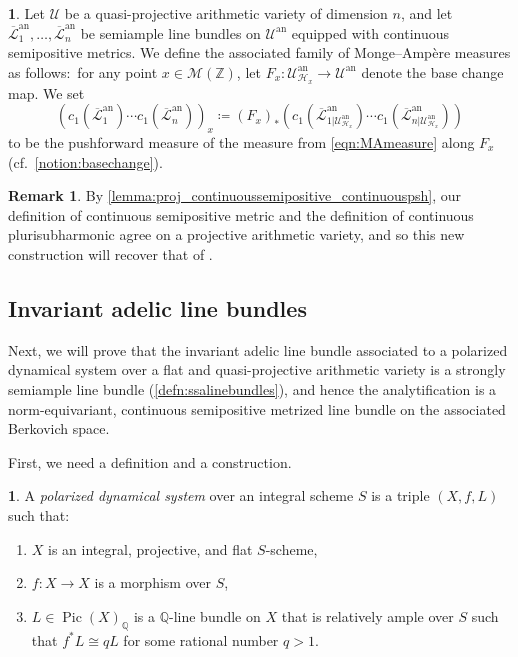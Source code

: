 \documentclass[11pt,reqno]{amsart}
\newcommand{\mZ}{\mathbb{Z}}
\newcommand{\mQ}{\mathbb{Q}}
\newcommand{\cU}{\mathcal{U}}
\newcommand{\cL}{\mathcal{L}}
\newcommand{\sH}{{\mathscr H}}
\newcommand{\sM}{{\mathscr M}}
\theoremstyle{theorem}
\numberwithin{equation}{subsection}
\numberwithin{equation}{subsection}
\theoremstyle{definition}
\newtheorem{definition}[subsubsection]{\text{Definition}}
\newtheorem{remark}[subsubsection]{Remark}
\theoremstyle{remark}
\numberwithin{equation}{subsubsection} \numberwithin{figure}{section}
\DeclareMathOperator{\an}{an}
\DeclareMathOperator{\Pic}{Pic}
\newcommand{\cdef}[1]{\textsf{\textit{#1}}}
\begin{document}
\begin{definition}\label{defn:MAmeasure_quasiproj}
Let $\cU$ be a quasi-projective arithmetic variety of dimension $n$, and let $\overline{\cL}_1^{\an},\dots, \overline{\cL}_n^{\an}$ be semiample line bundles on $\cU^{\an}$ equipped with continuous semipositive metrics.  
We define the associated family of Monge--Amp\`ere measures as follows:~for any point $x\in \sM(\mZ)$, let $F_x\colon \cU_{\sH_x}^{\an} \to \cU^{\an}$ denote the base change map. 
We set
\[
(c_1(\overline{\cL}_1^{\an})\cdots c_1(\overline{\cL}_n^{\an}))_x \coloneqq (F_x)_*(c_1(\overline{\cL}^{\an}_{1|\cU_{\sH_x}^{\an}})\cdots c_1(\overline{\cL}^{\an}_{n|\cU_{\sH_x}^{\an}}))
\]
to be the pushforward measure of the measure from \eqref{eqn:MAmeasure} along $F_x$ (cf.~\autoref{notion:basechange}). 
\end{definition}

\begin{remark}
By \autoref{lemma:proj_continuoussemipositive_continuouspsh}, our definition of continuous semipositive metric and the definition of continuous plurisubharmonic agree on a projective arithmetic variety, and so this new construction will recover that of \cite[Definition 4.8]{PilleSchneider:Global}. 
\end{remark}



\subsection{Invariant adelic line bundles}
\label{subsec:invariant_adelic}
Next, we will prove that the invariant adelic line bundle associated to a polarized dynamical system over a flat and quasi-projective arithmetic variety is a strongly semiample line bundle (\autoref{defn:ssalinebundles}), and hence the analytification is a norm-equivariant, continuous semipositive metrized line bundle on the associated Berkovich space. 

First, we need a definition and a construction.

\begin{definition}\label{defn:PDS}
A \cdef{polarized dynamical system} over an integral scheme $S$ is a triple $(X,f,L)$ such that:
\begin{enumerate}
\item $X$ is an integral, projective, and flat $S$-scheme,
\item $f\colon X \to X$ is a morphism over $S$,
\item $L\in \Pic(X)_{\mQ}$ is a $\mQ$-line bundle on $X$ that is relatively ample over $S$ such that $f^*L \cong qL$ for some rational number $q>1$. 
\end{enumerate}
\end{definition}
\end{document}
